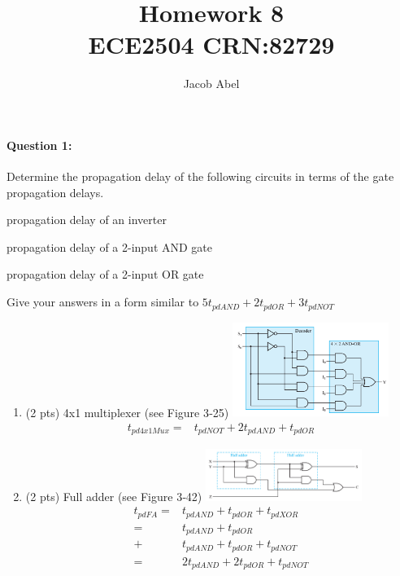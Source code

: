 \documentclass[12pt,letterpaper,titlepage]{report}
\author{Jacob Abel}
\title{%
	Homework 8
	\\\large ECE2504 CRN:82729
}
\begin{document}
\maketitle
\begin{raggedright}
\raggedcolumns
\paragraph{Question 1:}
Determine the propagation delay of the following circuits in terms of the gate propagation delays. 
\begin{description}[noitemsep]
\item[$t_{pdNOT}:$] propagation delay of an inverter 
\item[$t_{pdAND}:$]  propagation delay of a 2-input AND gate 
\item[$t_{pdOR}:$] propagation delay of a 2-input OR gate 
\end{description}
Give your answers in a form similar to $5 t_{pdAND} + 2 t_{pdOR} + 3 t_{pdNOT}$  
\begin{multicols}{2}
\begin{enumerate} [label=\alph*)]
\item (2 pts) 4x1 multiplexer (see Figure 3‐25) 
\includegraphics[width=0.4\textwidth,height=0.9\textheight,keepaspectratio=true]{hw8p1a}
\begin{align*}
t_{pd4x1Mux}=& t_{pdNOT}+2t_{pdAND}+t_{pdOR}
\end{align*}

\item (2 pts) Full adder (see Figure 3‐42) 
\includegraphics[width=0.4\textwidth,height=0.9\textheight,keepaspectratio=true]{hw8p1b}
\begin{align*}
t_{pdFA}=& t_{pdAND}+t_{pdOR}+t_{pdXOR}
      \\=& t_{pdAND}+t_{pdOR}
      \\+& t_{pdAND}+t_{pdOR}+t_{pdNOT}
      \\=& 2t_{pdAND}+2t_{pdOR}+t_{pdNOT}
\end{align*}


\end{enumerate}
\end{multicols}
\end{raggedright}
\end{document}
